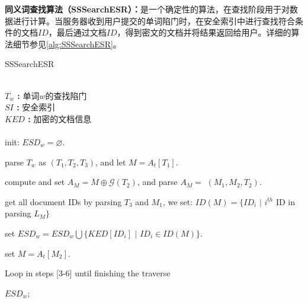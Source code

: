 \textbf{同义词查找算法（SSSearchESR）：}是一个确定性的算法，在查找阶段用于对数据进行计算。当服务器收到用户提交的单词陷门时，在安全索引中进行查找符合条件的文档$ID$，最后通过文档$ID$，得到密文的文档并将结果返回给用户。详细的算法细节参见\ref{alg:SSSearchESR}。
\begin{algorithm}[!htb]
\caption{ SSSearchESR }
\label{alg:SSSearchESR}

\begin{algorithmic} [1]

%
%
\REQUIRE ~~\\
    \textbf{${T_w}$ :} 单词$w$的查找陷门  \\

    \textbf{${SI}$ :} 安全索引   \\

    \textbf{${KED}$ :} 加密的文档信息\\
%
%
\ENSURE ~~\\

\STATE
init: $ESD_w = \varnothing $.

\STATE
parse {$ T_w $} as {$ (T_1, T_2, T_3) $}, and let {$ M = A_t[T_1] $}.

\STATE
compute and set {$ A_{M}= M \oplus \mathcal{G}(T_2) $}, and parse {$ A_{M} =$ $({M}_1, {M}_2, {T}_2) $}.

\STATE
get all document IDs by parsing {$ T_3 $} and {$ {M}_1 $},
we set: {$ ID({M}) = \{ ID_i $} $|$ $i^{th}$ ID in parsing {$ L_{M} \} $}

\STATE
set $ ESD_w = ESD_w \bigcup \{ KED[ID_i] $ $|$ $ ID_i \in ID({M}) \} $.

\STATE
set {$ M = A_t[ {M}_2 ] $}.

%


 \STATE
 Loop in steps [3-6] until finishing the traverse

%
%
\RETURN ${ESD_w}$;

\end{algorithmic}

\end{algorithm}




